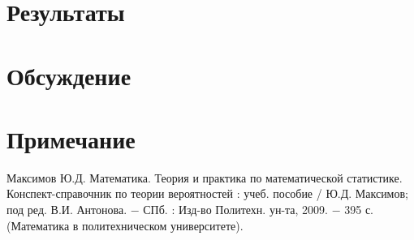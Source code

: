 \documentclass[a4paper]{article}
\begin{document}
\section{Результаты}
\section{Обсуждение}
\section*{Примечание}
\begin{thebibliography}{9}
 Максимов Ю.Д. Математика. Теория и практика по математической статистике. Конспект-справочник по теории вероятностей : учеб. пособие /
Ю.Д. Максимов; под ред. В.И. Антонова. $-$ СПб. : Изд-во Политехн.
ун-та, 2009. $-$ 395 с. (Математика в политехническом университете).
\end{thebibliography}
\end{document}
